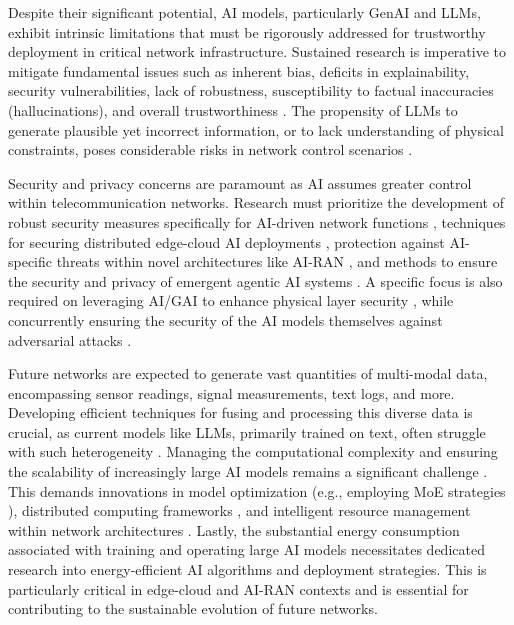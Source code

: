 \documentclass[sigconf]{acmart}
\begin{document}
Despite their significant potential, AI models, particularly GenAI and LLMs, exhibit intrinsic limitations that must be rigorously addressed for trustworthy deployment in critical network infrastructure. Sustained research is imperative to mitigate fundamental issues such as inherent bias, deficits in explainability, security vulnerabilities, lack of robustness, susceptibility to factual inaccuracies (hallucinations), and overall trustworthiness \cite{ref8, ref16, ref17, ref31, ref34, ref35}. The propensity of LLMs to generate plausible yet incorrect information, or to lack understanding of physical constraints, poses considerable risks in network control scenarios \cite{ref8, ref17}.

Security and privacy concerns are paramount as AI assumes greater control within telecommunication networks. Research must prioritize the development of robust security measures specifically for AI-driven network functions \cite{ref12}, techniques for securing distributed edge-cloud AI deployments \cite{ref31}, protection against AI-specific threats within novel architectures like AI-RAN \cite{ref34}, and methods to ensure the security and privacy of emergent agentic AI systems \cite{ref35}. A specific focus is also required on leveraging AI/GAI to enhance physical layer security \cite{ref5, ref30}, while concurrently ensuring the security of the AI models themselves against adversarial attacks \cite{ref20}.

Future networks are expected to generate vast quantities of multi-modal data, encompassing sensor readings, signal measurements, text logs, and more. Developing efficient techniques for fusing and processing this diverse data is crucial, as current models like LLMs, primarily trained on text, often struggle with such heterogeneity \cite{ref17, ref23}. Managing the computational complexity and ensuring the scalability of increasingly large AI models remains a significant challenge \cite{ref20, ref25, ref31}. This demands innovations in model optimization (e.g., employing MoE strategies \cite{ref20}), distributed computing frameworks \cite{ref31}, and intelligent resource management within network architectures \cite{ref34}. Lastly, the substantial energy consumption associated with training and operating large AI models necessitates dedicated research into energy-efficient AI algorithms and deployment strategies. This is particularly critical in edge-cloud and AI-RAN contexts \cite{ref29, ref31, ref34, ref35} and is essential for contributing to the sustainable evolution of future networks.
\end{document}
